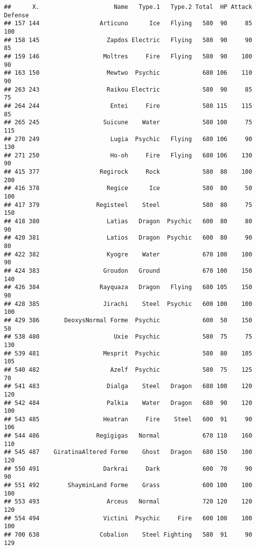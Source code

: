 \documentclass[
]{article}
\begin{document}
\begin{verbatim}
##      X.                     Name   Type.1   Type.2 Total  HP Attack Defense
## 157 144                 Articuno      Ice   Flying   580  90     85     100
## 158 145                   Zapdos Electric   Flying   580  90     90      85
## 159 146                  Moltres     Fire   Flying   580  90    100      90
## 163 150                   Mewtwo  Psychic            680 106    110      90
## 263 243                   Raikou Electric            580  90     85      75
## 264 244                    Entei     Fire            580 115    115      85
## 265 245                  Suicune    Water            580 100     75     115
## 270 249                    Lugia  Psychic   Flying   680 106     90     130
## 271 250                    Ho-oh     Fire   Flying   680 106    130      90
## 415 377                 Regirock     Rock            580  80    100     200
## 416 378                   Regice      Ice            580  80     50     100
## 417 379                Registeel    Steel            580  80     75     150
## 418 380                   Latias   Dragon  Psychic   600  80     80      90
## 420 381                   Latios   Dragon  Psychic   600  80     90      80
## 422 382                   Kyogre    Water            670 100    100      90
## 424 383                  Groudon   Ground            670 100    150     140
## 426 384                 Rayquaza   Dragon   Flying   680 105    150      90
## 428 385                  Jirachi    Steel  Psychic   600 100    100     100
## 429 386       DeoxysNormal Forme  Psychic            600  50    150      50
## 538 480                     Uxie  Psychic            580  75     75     130
## 539 481                  Mesprit  Psychic            580  80    105     105
## 540 482                    Azelf  Psychic            580  75    125      70
## 541 483                   Dialga    Steel   Dragon   680 100    120     120
## 542 484                   Palkia    Water   Dragon   680  90    120     100
## 543 485                  Heatran     Fire    Steel   600  91     90     106
## 544 486                Regigigas   Normal            670 110    160     110
## 545 487    GiratinaAltered Forme    Ghost   Dragon   680 150    100     120
## 550 491                  Darkrai     Dark            600  70     90      90
## 551 492        ShayminLand Forme    Grass            600 100    100     100
## 553 493                   Arceus   Normal            720 120    120     120
## 554 494                  Victini  Psychic     Fire   600 100    100     100
## 700 638                 Cobalion    Steel Fighting   580  91     90     129

\end{verbatim}
\end{document}
